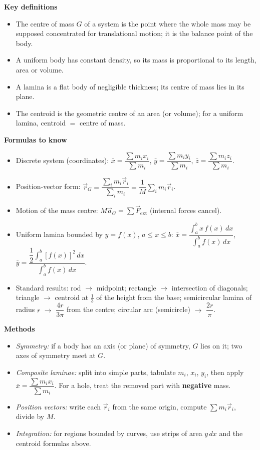 \documentclass[11pt]{article}
\newcommand{\cle}[1]{{\popxbold\color{popdark}#1}}
\begin{document}
\begin{bilan}
\textbf{Key definitions}
\begin{itemize}
\item The \cle{centre of mass} $G$ of a system is the point where the whole mass may be supposed concentrated for translational motion; it is the balance point of the body.
\item A \cle{uniform} body has constant density, so its mass is proportional to its length, area or volume.
\item A \cle{lamina} is a flat body of negligible thickness; its centre of mass lies in its plane.
\item The \cle{centroid} is the geometric centre of an area (or volume); for a uniform lamina, centroid $=$ centre of mass.
\end{itemize}

\textbf{Formulas to know}
\begin{itemize}
\item Discrete system (coordinates): $\bar{x}=\dfrac{\sum m_ix_i}{\sum m_i}$, $\bar{y}=\dfrac{\sum m_iy_i}{\sum m_i}$, $\bar{z}=\dfrac{\sum m_iz_i}{\sum m_i}$.
\item Position-vector form: $\vec{r}_G=\dfrac{\sum_{i} m_i\vec{r}_i}{\sum_i m_i}=\dfrac{1}{M}\sum_i m_i\vec{r}_i$.
\item Motion of the mass centre: $M\vec{a}_G=\sum \vec{F}_{\mathrm{ext}}$ (internal forces cancel).
\item Uniform lamina bounded by $y=f(x)$, $a\le x\le b$:
$\bar{x}=\dfrac{\displaystyle\int_a^b x\,f(x)\,dx}{\displaystyle\int_a^b f(x)\,dx}$, \quad $\bar{y}=\dfrac{\dfrac12\displaystyle\int_a^b [f(x)]^2\,dx}{\displaystyle\int_a^b f(x)\,dx}$.
\item Standard results: rod $\to$ midpoint; rectangle $\to$ intersection of diagonals; triangle $\to$ centroid at $\tfrac13$ of the height from the base; semicircular lamina of radius $r$ $\to$ $\dfrac{4r}{3\pi}$ from the centre; circular arc (semicircle) $\to$ $\dfrac{2r}{\pi}$.
\end{itemize}

\textbf{Methods}
\begin{itemize}
\item \emph{Symmetry:} if a body has an axis (or plane) of symmetry, $G$ lies on it; two axes of symmetry meet at $G$.
\item \emph{Composite laminae:} split into simple parts, tabulate $m_i$, $x_i$, $y_i$, then apply $\bar{x}=\dfrac{\sum m_ix_i}{\sum m_i}$. For a hole, treat the removed part with \textbf{negative} mass.
\item \emph{Position vectors:} write each $\vec{r}_i$ from the same origin, compute $\sum m_i\vec{r}_i$, divide by $M$.
\item \emph{Integration:} for regions bounded by curves, use strips of area $y\,dx$ and the centroid formulas above.
\end{itemize}


\end{bilan}
\end{document}
